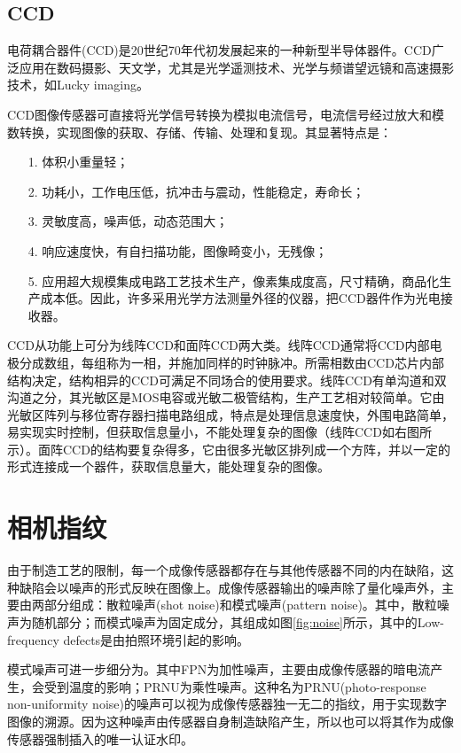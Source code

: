 \documentclass[a4paper,11pt]{article}
\begin{document}
 \subsection{CCD}
电荷耦合器件(CCD)是20世纪70年代初发展起来的一种新型半导体器件。CCD广泛应用在数码摄影、天文学，尤其是光学遥测技术、光学与频谱望远镜和高速摄影技术，如Lucky imaging。

CCD图像传感器可直接将光学信号转换为模拟电流信号，电流信号经过放大和模数转换，实现图像的获取、存储、传输、处理和复现。其显著特点是：
\begin{itemize}
\item[1.] 体积小重量轻；
\item[2.] 功耗小，工作电压低，抗冲击与震动，性能稳定，寿命长；
\item[3.] 灵敏度高，噪声低，动态范围大；
\item [4.]响应速度快，有自扫描功能，图像畸变小，无残像；
\item [5.]应用超大规模集成电路工艺技术生产，像素集成度高，尺寸精确，商品化生产成本低。因此，许多采用光学方法测量外径的仪器，把CCD器件作为光电接收器。
\end{itemize}

CCD从功能上可分为线阵CCD和面阵CCD两大类。线阵CCD通常将CCD内部电极分成数组，每组称为一相，并施加同样的时钟脉冲。所需相数由CCD芯片内部结构决定，结构相异的CCD可满足不同场合的使用要求。线阵CCD有单沟道和双沟道之分，其光敏区是MOS电容或光敏二极管结构，生产工艺相对较简单。它由光敏区阵列与移位寄存器扫描电路组成，特点是处理信息速度快，外围电路简单，易实现实时控制，但获取信息量小，不能处理复杂的图像（线阵CCD如右图所示）。面阵CCD的结构要复杂得多，它由很多光敏区排列成一个方阵，并以一定的形式连接成一个器件，获取信息量大，能处理复杂的图像。

\section{相机指纹}
由于制造工艺的限制，每一个成像传感器都存在与其他传感器不同的内在缺陷，这种缺陷会以噪声的形式反映在图像上。成像传感器输出的噪声除了量化噪声外，主要由两部分组成：散粒噪声(shot noise)和模式噪声(pattern noise)。其中，散粒噪声为随机部分；而模式噪声为固定成分，其组成如图\ref{fig:noise}所示，其中的Low-frequency defects是由拍照环境引起的影响。

模式噪声可进一步细分为。其中FPN为加性噪声，主要由成像传感器的暗电流产生，会受到温度的影响；PRNU为乘性噪声。这种名为PRNU(photo-response non-uniformity noise)的噪声可以视为成像传感器独一无二的指纹，用于实现数字图像的溯源。因为这种噪声由传感器自身制造缺陷产生，所以也可以将其作为成像传感器强制插入的唯一认证水印。
\\
\end{document}
